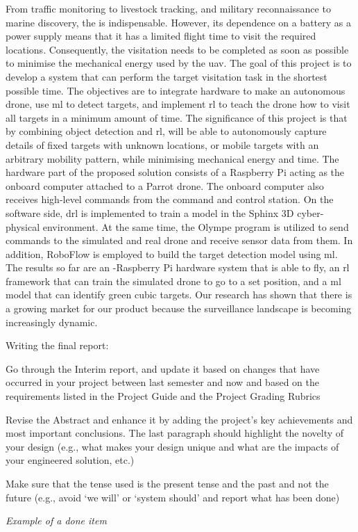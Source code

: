 \documentclass[../main.tex]{subfiles}
\begin{document}
From traffic monitoring to livestock tracking, and 
military reconnaissance to marine discovery, the \uav
is indispensable.
However, its dependence on a battery as a power supply means
that it has a limited flight time to visit the required
locations. 
Consequently, the visitation needs to be
completed as soon as possible to minimise 
the mechanical energy used by the \gls{uav}.
The goal of this project is to develop a system 
that can perform the target visitation task in the shortest
possible time. The objectives are to integrate hardware to make
an autonomous drone, use \gls{ml} 
to detect targets,
and implement \gls{rl} to 
teach the drone how to visit all targets in a minimum amount of time.
The significance of this project is that 
by combining object detection and \gls{rl}, \uavs will be
able to autonomously capture details of 
fixed targets with unknown locations, 
or mobile targets with an arbitrary mobility pattern,
while minimising mechanical energy and time.
The hardware part of the proposed solution 
consists of a Raspberry Pi acting as the onboard computer
attached to a Parrot \anafi drone. The onboard computer
also receives high-level commands from the command and control
station. On the software side, \gls{drl} is 
implemented to train a model in the Sphinx 3D
cyber-physical environment. At the same time,
the Olympe program is utilized
to send commands to the simulated and real \anafi drone
and receive sensor data from them. 
In addition, RoboFlow is employed
to build the target detection model using \gls{ml}.
The results so far are an \anafi-Raspberry Pi hardware system
that is able to fly, an \gls{rl} framework that can train the
simulated drone to go to a set position, and a \gls{ml}
model that can identify green cubic targets.
Our research has shown that there is a growing market for
our product because the surveillance landscape
is becoming increasingly dynamic.

\vfill
\begin{newrequirements}
    Writing the final report:
    \begin{todolist}
        \item Go through the Interim report, 
            and update it based on changes that have occurred 
            in your project between last semester and now
            and based on the requirements listed in the 
            Project Guide and the Project Grading Rubrics
        \item Revise the Abstract and enhance it by adding 
            the project’s key achievements and most important 
            conclusions. 
            The last paragraph should highlight the novelty 
            of your design (e.g., what makes your design 
            unique and what are the impacts of your 
            engineered solution, etc.)
        \item Make sure that the tense used is the present 
            tense and the past and not the future 
            (e.g., avoid ‘we will’ or ‘system should’ 
            and report what has been done) 
        \item[\done] \textit{Example of a done item}
    \end{todolist}
\end{newrequirements}
\vspace{0.5cm}
\end{document}
